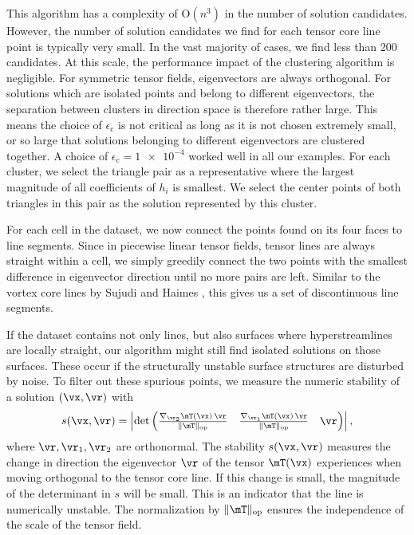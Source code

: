 %
This algorithm has a complexity of $\mathrm{O}(n^3)$ in the number of solution
candidates.
%
However, the number of solution candidates we find for each tensor core line
point is typically very small.
%
In the vast majority of cases, we find less than \num{200} candidates.
%
At this scale, the performance impact of the clustering algorithm is negligible.
%
For symmetric tensor fields, eigenvectors are always orthogonal.
%
For solutions which are isolated points and belong to different eigenvectors,
the separation between clusters in direction space is therefore rather large.
%
This means the choice of $\epsilon_{\mathrm{c}}$ is not critical as long as
it is not chosen extremely small, or so large that solutions belonging to
different eigenvectors are clustered together.
%
A choice of $\epsilon_{\mathrm{c}} = \num{1e-4}$ worked well in all our
examples.
%
For each cluster, we select the triangle pair as a representative where the
largest magnitude of all coefficients of $h_i$ is smallest.
%
We select the center points of both triangles in this pair as the solution
represented by this cluster.
%

%
For each cell in the dataset, we now connect the points found on its four faces
to line segments.
%
Since in piecewise linear tensor fields, tensor lines are always straight within
a cell, we simply greedily connect the two points with the smallest difference
in eigenvector direction until no more pairs are left.
%
Similar to the vortex core lines by Sujudi and Haimes \cite{Sujudi1995}, this
gives us a set of discontinuous line segments.
%

%
If the dataset contains not only lines, but also surfaces where hyperstreamlines
are locally straight, our algorithm might still find isolated solutions on those
surfaces.
%
These occur if the structurally unstable surface structures are disturbed by
noise.
%
To filter out these spurious points, we measure the numeric stability of
a solution $(\vx, \vr)$ with
%
\begin{equation}
  s(\vx, \vr) = \left|\det
      \begin{pmatrix}
          \frac{\nabla_{\vr_2}\mT(\vx)\,\vr}{\|\mT\|_{\mathrm{op}}} &
          \frac{\nabla_{\vr_1}\mT(\vx)\,\vr}{\|\mT\|_{\mathrm{op}}} &
          \vr
      \end{pmatrix}\right| \text{,}
\end{equation}
%
where $\vr, \vr_1, \vr_2$ are orthonormal.
%
The stability $s(\vx, \vr)$ measures the change in direction the eigenvector
$\vr$ of the tensor $\mT(\vx)$ experiences when moving orthogonal to the tensor
core line.
%
If this change is small, the magnitude of the determinant in $s$ will be small.
%
This is an indicator that the line is numerically unstable.
%
The normalization by $\|\mT\|_{\mathrm{op}}$ ensures the independence of the
scale of the tensor field.
%

